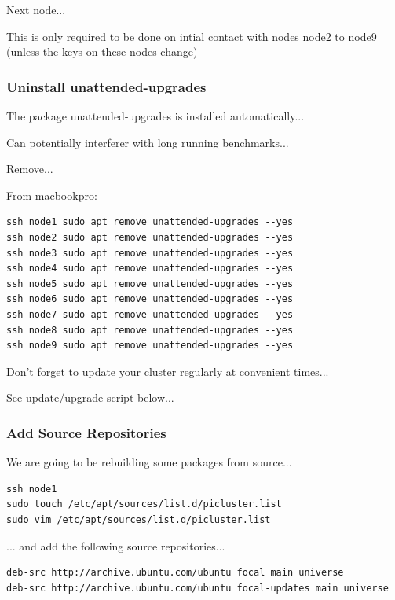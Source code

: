 \documentclass{article}
\begin{document}
Next node...

This is only required to be done on intial contact with nodes node2 to node9 (unless the keys on these nodes change)



\subsubsection{Uninstall unattended-upgrades}

The package unattended-upgrades is installed automatically...

Can potentially interferer with long running benchmarks...

Remove...

From macbookpro:

\begin{lstlisting}[]
ssh node1 sudo apt remove unattended-upgrades --yes
ssh node2 sudo apt remove unattended-upgrades --yes
ssh node3 sudo apt remove unattended-upgrades --yes
ssh node4 sudo apt remove unattended-upgrades --yes
ssh node5 sudo apt remove unattended-upgrades --yes
ssh node6 sudo apt remove unattended-upgrades --yes
ssh node7 sudo apt remove unattended-upgrades --yes
ssh node8 sudo apt remove unattended-upgrades --yes
ssh node9 sudo apt remove unattended-upgrades --yes
\end{lstlisting}

Don't forget to update your cluster regularly at convenient times...

See update/upgrade script below...


\subsubsection{Add Source Repositories}

We are going to be rebuilding some packages from source...

\begin{lstlisting}[]
ssh node1
sudo touch /etc/apt/sources/list.d/picluster.list
sudo vim /etc/apt/sources/list.d/picluster.list
\end{lstlisting}

... and add the following source repositories...

\begin{lstlisting}[caption=/etc/apt/sources.list.d/picluster.list]
deb-src http://archive.ubuntu.com/ubuntu focal main universe
deb-src http://archive.ubuntu.com/ubuntu focal-updates main universe
\end{lstlisting}
\end{document}
